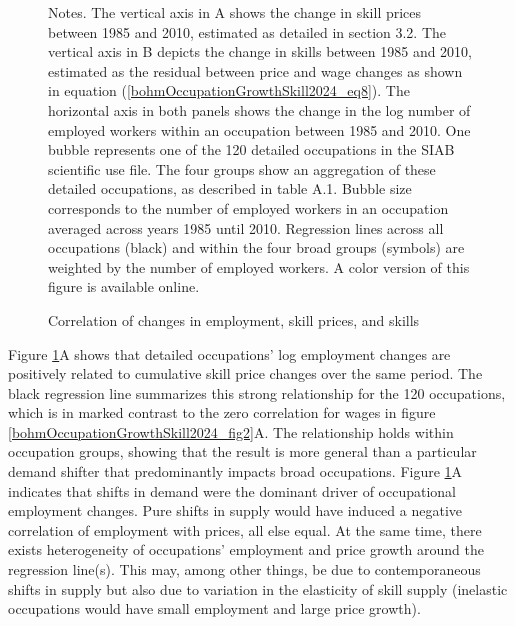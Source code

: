 \documentclass[12pt]{article}
\theoremstyle{definition}
\begin{document}
\begin{figure}[H]
    \noindent\caption{Correlation of changes in employment, skill prices, and skills}
    \begin{center}
        \label{bohmOccupationGrowthSkill2024_fig6}
    \end{center}
    \vspace{-20pt}
    {\footnotesize Notes. The vertical axis in A shows the change in skill prices between 1985 and 2010, estimated as detailed in section 3.2. The vertical axis in B depicts the change in skills between 1985 and 2010, estimated as the residual between price and wage changes as shown in equation (\ref{bohmOccupationGrowthSkill2024_eq8}). The horizontal axis in both panels shows the change in the log number of employed workers within an occupation between 1985 and 2010. One bubble represents one of the 120 detailed occupations in the SIAB scientific use file. The four groups show an aggregation of these detailed occupations, as described in table A.1. Bubble size corresponds to the number of employed workers in an occupation averaged across years 1985 until 2010. Regression lines across all occupations (black) and within the four broad groups (symbols) are weighted by the number of employed workers. A color version of this figure is available online.}
\end{figure}

Figure \ref{bohmOccupationGrowthSkill2024_fig6}A shows that detailed occupations' log employment changes are positively related to cumulative skill price changes over the same period. The black regression line summarizes this strong relationship for the 120 occupations, which is in marked contrast to the zero correlation for wages in figure \ref{bohmOccupationGrowthSkill2024_fig2}A. The relationship holds within occupation groups, showing that the result is more general than a particular demand shifter that predominantly impacts broad occupations. Figure \ref{bohmOccupationGrowthSkill2024_fig6}A indicates that shifts in demand were the dominant driver of occupational employment changes. Pure shifts in supply would have induced a negative correlation of employment with prices, all else equal. At the same time, there exists heterogeneity of occupations' employment and price growth around the regression line(s). This may, among other things, be due to contemporaneous shifts in supply but also due to variation in the elasticity of skill supply (inelastic occupations would have small employment and large price growth).
\end{document}
